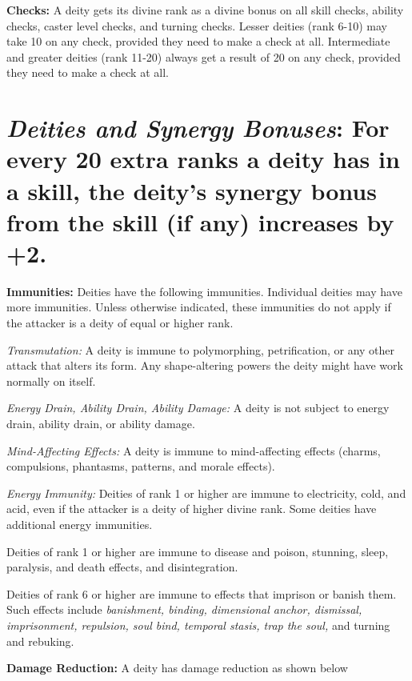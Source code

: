 \documentclass{article}
\begin{document}
\vspace{12pt}
\textbf{Checks:} A deity gets its divine rank as a divine bonus on all skill checks, 
ability checks, caster level checks, and turning checks. Lesser deities (rank 6-10) 
may take 10 on any check, provided they need to make a check at all. Intermediate 
and greater deities (rank 11-20) always get a result of 20 on any check, provided 
they need to make a check at all.

\section*{\textit{Deities and Synergy Bonuses}: For every 20 extra ranks a deity 
has in a skill, the deity's synergy bonus from the skill (if any) increases by 
+2.}

\vspace{12pt}
\textbf{Immunities:} Deities have the following immunities. Individual deities 
may have more immunities. Unless otherwise indicated, these immunities do not apply 
if the attacker is a deity of equal or higher rank.

\textit{Transmutation: }A deity is immune to polymorphing, petrification, or any 
other attack that alters its form. Any shape-altering powers the deity might have 
work normally on itself.

\textit{Energy Drain, Ability Drain, Ability Damage: }A deity is not subject to 
energy drain, ability drain, or ability damage.

\textit{Mind-Affecting Effects: }A deity is immune to mind-affecting effects (charms, 
compulsions, phantasms, patterns, and morale effects).

\textit{Energy Immunity: }Deities of rank 1 or higher are immune to electricity, 
cold, and acid, even if the attacker is a deity of higher divine rank. Some deities 
have additional energy immunities.

Deities of rank 1 or higher are immune to disease and poison, stunning, sleep, 
paralysis, and death effects, and disintegration.

Deities of rank 6 or higher are immune to effects that imprison or banish them. 
Such effects include \textit{banishment, binding, dimensional anchor, dismissal, 
imprisonment, repulsion, soul bind, temporal stasis, trap the soul, }and turning 
and rebuking.

\vspace{12pt}
\textbf{Damage Reduction:} A deity has damage reduction as shown below
\end{document}
